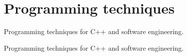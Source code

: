 \hypertarget{group__programming__tech}{}\section{Programming techniques}
\label{group__programming__tech}


Programming techniques for C++ and software engineering.  


Programming techniques for C++ and software engineering. 

